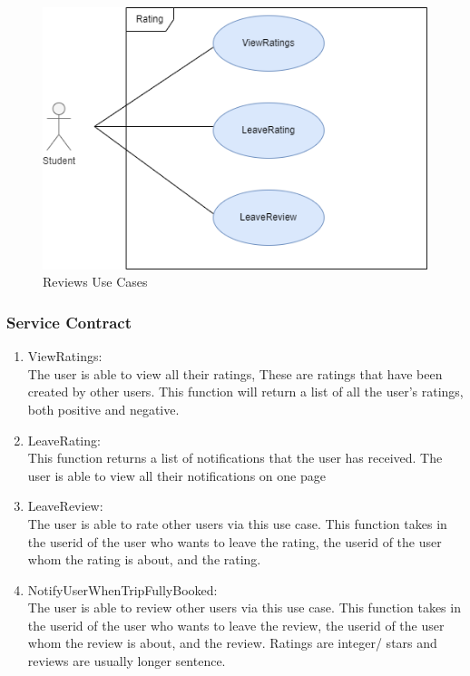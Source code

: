 \documentclass[hidelinks, 12pt, a4paper]{article}
\begin{document}
\begin{figure}[H]

      \centering
      \includegraphics[]{images/Rating Usecase.drawio.png}
      \caption{Reviews Use Cases}
      \label{fig:User UseCases}

\end{figure}
\newpage
\subsubsection{Service Contract}

\begin{enumerate}[label=U1.\arabic*]

      \item ViewRatings:\\
            The user is able to view all their ratings, These are ratings that have been created by other users. This function will return a list of all the user’s ratings, both positive and negative.\\

      \item LeaveRating:\\
            This function returns a list of notifications that the user has received. The user is able to view all their notifications on one page\\

      \item LeaveReview:\\
            The user is able to rate other users via this use case. This function takes in the userid of the user who wants to leave the rating, the userid of the user whom the rating is about, and the rating.\\

      \item NotifyUserWhenTripFullyBooked: \\
            The user is able to review other users via this use case. This function takes in the userid of the user who wants to leave the review, the userid of the user whom the review is about, and the review. Ratings are integer/ stars and reviews are usually longer sentence.\\

\end{enumerate}
\end{document}
